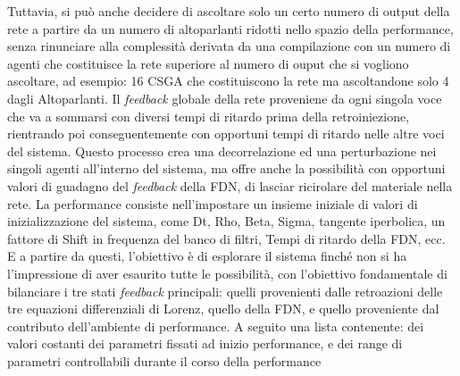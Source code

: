 Tuttavia, si può anche decidere di ascoltare solo un certo numero di output
della rete a partire da un numero di altoparlanti ridotti nello spazio della performance,
senza rinunciare alla complessità derivata da una compilazione con un
numero di agenti che costituisce la rete superiore al numero di ouput che si vogliono ascoltare, 
ad esempio: 16 CSGA che costituiscono la rete ma ascoltandone solo 4 dagli Altoparlanti.
Il \emph{feedback} globale della rete proveniene da ogni singola voce 
che va a sommarsi con diversi tempi di ritardo prima della retroiniezione,
rientrando poi conseguentemente con opportuni tempi di ritardo nelle altre voci del sistema.
Questo processo crea una decorrelazione ed una perturbazione nei singoli agenti all'interno del sistema,
ma offre anche la possibilità con opportuni valori di guadagno del \emph{feedback} della FDN, 
di lasciar ricirolare del materiale nella rete.
La performance consiste nell'impostare un insieme iniziale di valori 
di inizializzazione del sistema, come Dt, Rho, Beta, Sigma, 
tangente iperbolica, 
un fattore di Shift in frequenza del banco di filtri, 
Tempi di ritardo della FDN, ecc.
E a partire da questi, l'obiettivo è di esplorare il sistema 
finché non si ha l'impressione di aver esaurito tutte le possibilità, 
con l'obiettivo fondamentale di bilanciare i tre stati \emph{feedback} principali: 
quelli provenienti dalle retroazioni delle tre equazioni differenziali 
di Lorenz, quello della FDN, e quello proveniente dal contributo 
dell'ambiente di performance.
A seguito una lista contenente: dei valori costanti dei parametri fissati ad inizio performance, e
dei range di parametri controllabili durante il corso della performance

